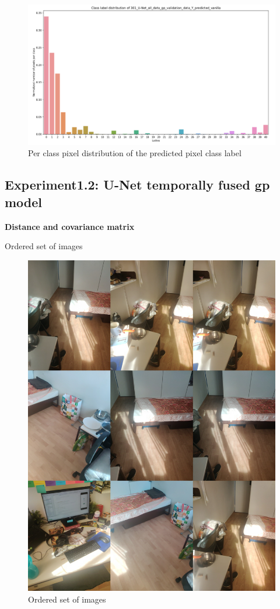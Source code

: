 	\begin{figure}
		\centering
		\includegraphics[width=16cm]{images/Y_predicted_vanilla.png}
		\caption{Per class pixel distribution of the predicted pixel class label}
		\label{fig:y_predi_vanilla}
	\end{figure}    

    \subsection{Experiment1.2: U-Net temporally fused gp model}
    
    { \bf Distance and covariance matrix}
    
    Ordered set of images
    
    \begin{figure}
    	\centering
    	\includegraphics[width=12cm]{images/ordered_images.jpg}
    	\caption{Ordered set of images}
    	\label{fig:ordered set of images}
    \end{figure}
	
